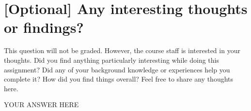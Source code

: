 \documentclass{article}
\begin{document}
\section*{[Optional] Any interesting thoughts or findings?}

This question will not be graded. However, the course staff is interested in your thoughts. Did you find anything particularly interesting while doing this assignment? Did any of your background knowledge or experiences help you complete it? How did you find things overall? Feel free to share any thoughts here.
\bigskip
\begin{mdframed}

        YOUR ANSWER HERE
        
\end{mdframed}
\end{document}
